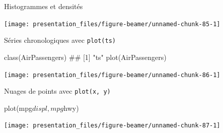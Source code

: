 \documentclass[12pt,ignorenonframetext,handout,]{beamer}
\newenvironment{Shaded}{}{}
\newcommand{\DataTypeTok}[1]{#1}
\newcommand{\FloatTok}[1]{#1}
\newcommand{\KeywordTok}[1]{\textcolor[rgb]{0.00,0.00,1.00}{#1}}
\newcommand{\NormalTok}[1]{#1}
\newcommand{\OperatorTok}[1]{#1}
\newcommand{\StringTok}[1]{\textcolor[rgb]{0.00,0.50,0.50}{#1}}
\renewenvironment{Shaded}{\begin{snugshade}}{\end{snugshade}}
\begin{document}
\begin{frame}[fragile]{Histogrammes et densités}
\protect\hypertarget{histogrammes-et-densites-2}{}

\centering \footnotesize

\begin{Shaded}
\end{Shaded}

\texttt{[image: presentation\_files/figure-beamer/unnamed-chunk-85-1]}

\end{frame}

\begin{frame}[fragile]{Séries chronologiques avec \texttt{plot(ts)}}
\protect\hypertarget{series-chronologiques-avec-plotts}{}

\centering \footnotesize

\begin{Shaded}
\begin{Highlighting}[]
\KeywordTok{class}\NormalTok{(AirPassengers)}
\NormalTok{  ## [1] "ts"}
\KeywordTok{plot}\NormalTok{(AirPassengers)}
\end{Highlighting}
\end{Shaded}

\texttt{[image: presentation\_files/figure-beamer/unnamed-chunk-86-1]}

\end{frame}

\begin{frame}[fragile]{Nuages de points avec \texttt{plot(x,\ y)}}
\protect\hypertarget{nuages-de-points-avec-plotx-y}{}

\centering \footnotesize

\begin{Shaded}
\begin{Highlighting}[]
\KeywordTok{plot}\NormalTok{(mpg}\OperatorTok{$}\NormalTok{displ, mpg}\OperatorTok{$}\NormalTok{hwy)}
\end{Highlighting}
\end{Shaded}

\texttt{[image: presentation\_files/figure-beamer/unnamed-chunk-87-1]}

\end{frame}
\end{document}
